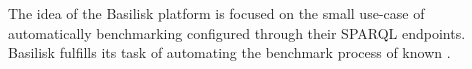 
The idea of the Basilisk platform is focused on the small use-case of automatically benchmarking configured \tsp{} through their SPARQL endpoints.
Basilisk fulfills its task of automating the benchmark process of known \ts{}.






